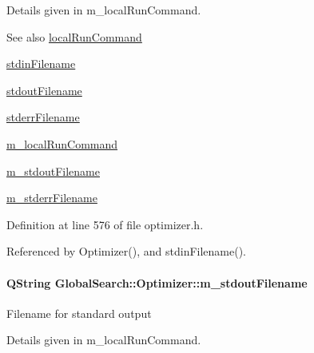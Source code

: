 Details given in m\+\_\+local\+Run\+Command.

\begin{DoxySeeAlso}{See also}
\hyperlink{classGlobalSearch_1_1Optimizer_aed5eb285d45a001c9520c2ed3a5b57a1}{local\+Run\+Command} 

\hyperlink{classGlobalSearch_1_1Optimizer_a5964a9b38d3ae90c8ac36a75d3a35832}{stdin\+Filename} 

\hyperlink{classGlobalSearch_1_1Optimizer_a217750aa50431f9948aa8164fb99de0c}{stdout\+Filename} 

\hyperlink{classGlobalSearch_1_1Optimizer_acaa83cc6bf1dcc263b92450b4f8cb652}{stderr\+Filename} 

\hyperlink{classGlobalSearch_1_1Optimizer_a1cdb6b6c5e929e84c834ba93148fb31e}{m\+\_\+local\+Run\+Command} 

\hyperlink{classGlobalSearch_1_1Optimizer_a5ed04fdd5f8b511249e408adcd174550}{m\+\_\+stdout\+Filename} 

\hyperlink{classGlobalSearch_1_1Optimizer_a75b800a7f90a03d551f6795404d0c8f1}{m\+\_\+stderr\+Filename} 
\end{DoxySeeAlso}


Definition at line 576 of file optimizer.\+h.



Referenced by Optimizer(), and stdin\+Filename().

\hypertarget{classGlobalSearch_1_1Optimizer_a5ed04fdd5f8b511249e408adcd174550}{}
\paragraph[{m\+\_\+stdout\+Filename}]{\setlength{\rightskip}{0pt plus 5cm}Q\+String Global\+Search\+::\+Optimizer\+::m\+\_\+stdout\+Filename\hspace{0.3cm}{\ttfamily [protected]}}\label{classGlobalSearch_1_1Optimizer_a5ed04fdd5f8b511249e408adcd174550}
Filename for standard output

Details given in m\+\_\+local\+Run\+Command.

